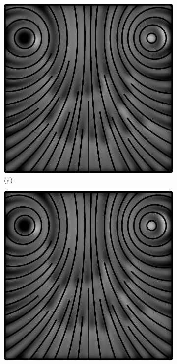 \begin{figure}[ht]
    \centering
    \begin{subfigure}[b]{.32\textwidth}
        \centering
        \includegraphics[scale=.08]{figures/TBGyro.png}
        \caption*{(a)}
    \end{subfigure}
    \begin{subfigure}[b]{.32\textwidth}
        \centering
        \includegraphics[scale=.08]{figures/TBGyro.png}

\end{subfigure}
\end{figure}
